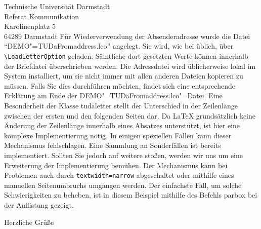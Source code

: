 \documentclass[
	german,%
	accentcolor=9c,%
	premium=true,%
]{tudaletter}
\begin{document}
\begin{letter}{%
	Technische Universität Darmstadt\\%
	Referat Kommunikation\\%
	Karolinenplatz 5\\%
	64289 Darmstadt}
Für Wiederverwendung der Absenderadresse wurde die Datei \enquote{DEMO"=TUDaFromaddress.lco} angelegt. Sie wird, wie bei \KOMAScript{} üblich, über \verb+\LoadLetterOption+ geladen. Sämtliche dort gesetzten Werte können innerhalb der Briefdatei überschrieben werden.
Die Adressdatei wird üblicherweise lokal im System installiert, um sie nicht immer mit allen anderen Dateien kopieren zu müssen. Falls Sie dies durchführen möchten, findet sich eine entsprechende Erklärung am Ende der DEMO"=TUDaFromaddress.lco"=Datei.
Eine Besonderheit der Klasse tudaletter stellt der Unterschied in der Zeilenlänge zwischen der ersten und den folgenden Seiten dar. Da \LaTeX{} grundsätzlich keine Änderung der Zeilenlänge innerhalb eines Absatzes unterstützt, ist hier eine komplexe Implementierung nötig. In einigen speziellen Fällen kann dieser Mechanismus fehlschlagen. Eine Sammlung an Sonderfällen ist bereits implementiert. Sollten Sie jedoch auf weitere stoßen, werden wir uns um eine Erweiterung der Implementierung bemühen. Der Mechanismus kann bei Problemen auch durch \verb+textwidth=narrow+ abgeschaltet oder mithilfe eines manuellen Seitenumbruchs umgangen werden.
Der einfachste Fall, um solche Schwierigkeiten zu beheben, ist in diesem Beispiel mithilfe des Befehls parbox bei der Auflistung gezeigt.

\closing{Herzliche Grüße}


\end{letter}
\end{document}
